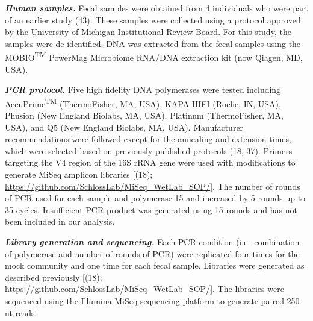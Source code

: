 \documentclass[11pt,]{article}
\begin{document}
\textbf{\emph{Human samples.}} Fecal samples were obtained from 4
individuals who were part of an earlier study (43). These samples were
collected using a protocol approved by the University of Michigan
Institutional Review Board. For this study, the samples were
de-identified. DNA was extracted from the fecal samples using the
MOBIO\textsuperscript{TM} PowerMag Microbiome RNA/DNA extraction kit
(now Qiagen, MD, USA).

\textbf{\emph{PCR protocol.}} Five high fidelity DNA polymerases were
tested including AccuPrime\textsuperscript{TM} (ThermoFisher, MA, USA),
KAPA HIFI (Roche, IN, USA), Phusion (New England Biolabs, MA, USA),
Platinum (ThermoFisher, MA, USA), and Q5 (New England Biolabs, MA, USA).
Manufacturer recommendations were followed except for the annealing and
extension times, which were selected based on previously published
protocols (18, 37). Primers targeting the V4 region of the 16S rRNA gene
were used with modifications to generate MiSeq amplicon libraries
{[}(18); \url{https://github.com/SchlossLab/MiSeq_WetLab_SOP/}{]}. The
number of rounds of PCR used for each sample and polymerase 15 and
increased by 5 rounds up to 35 cycles. Insufficient PCR product was
generated using 15 rounds and has not been included in our analysis.

\textbf{\emph{Library generation and sequencing.}} Each PCR condition
(i.e.~combination of polymerase and number of rounds of PCR) were
replicated four times for the mock community and one time for each fecal
sample. Libraries were generated as described previously {[}(18);
\url{https://github.com/SchlossLab/MiSeq_WetLab_SOP/}{]}. The libraries
were sequenced using the Illumina MiSeq sequencing platform to generate
paired 250-nt reads.
\end{document}
